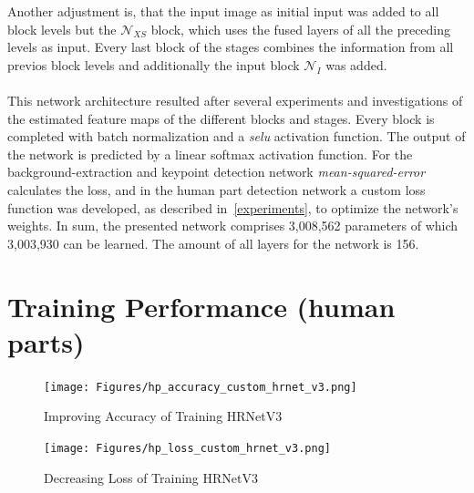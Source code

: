 Another adjustment is, that the input image as initial input was added to all block levels but the $\mathcal{N}_{XS}$
block, which uses the fused layers of all the preceding levels as input.
Every last block of the stages combines the information from all previos block levels and additionally
the input block $\mathcal{N}_I$ was added.
\\\mbox{}\\
This network architecture resulted after several experiments and investigations of the estimated feature maps of the
different blocks and stages.
Every block is completed with batch normalization and a \textit{selu} activation function.
The output of the network is predicted by a linear softmax activation function.
For the background-extraction and keypoint detection network \textit{mean-squared-error} calculates the loss, and in the
human part detection network a custom loss function was developed, as described in~\autoref{experiments}, to optimize
the network's weights.
In sum, the presented network comprises 3,008,562 parameters of which 3,003,930 can be learned.
The amount of all layers for the network is 156.\\







\section{Training Performance (human parts)}
\begin{figure}
    \centering
    \texttt{[image: Figures/hp\_accuracy\_custom\_hrnet\_v3.png]}
    \decoRule
    \caption[HRNetv3 Training Process: Accuracy]{Improving Accuracy of Training HRNetV3}
    \label{fig:hp_accuracy_hrnet_v3}
\end{figure}
\begin{figure}
    \centering
    \texttt{[image: Figures/hp\_loss\_custom\_hrnet\_v3.png]}
    \decoRule
    \caption[HRNetv3 Training Process: Loss]{Decreasing Loss of Training HRNetV3}
    \label{fig:hp_loss_hrnet_v3}
\end{figure}

